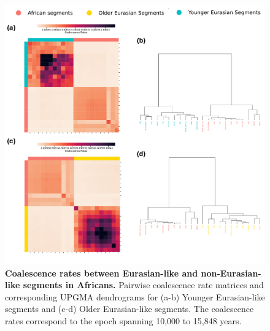 \begin{figure}
    \centering
    \includegraphics[width=\textwidth]{figures/gb_bta/gb_real_bta_source_afronly.pdf}
    \caption{\textbf{Coalescence rates between Eurasian-like and non-Eurasian-like segments in Africans.} Pairwise coalescence rate matrices and corresponding UPGMA dendrograms for (a-b) Younger Eurasian-like segments and (c-d) Older Eurasian-like segments. The coalescence rates correspond to the epoch spanning 10,000 to 15,848 years.}
    \label{fig:gb_bta_source_afronly}
\end{figure}

